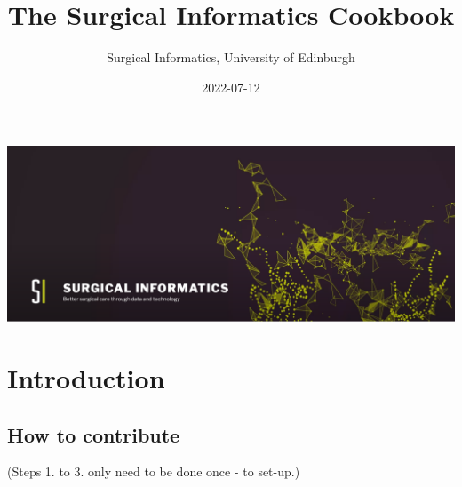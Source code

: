 \documentclass[
]{book}
\title{The Surgical Informatics Cookbook}
\author{Surgical Informatics, University of Edinburgh}
\date{2022-07-12}
\begin{document}
\maketitle

{
\setcounter{tocdepth}{1}
\tableofcontents
}
\hypertarget{section}{%
\chapter*{}\label{section}}

\includegraphics[width=30.97in]{img/surgical_informatics_minibanner}

\hypertarget{introduction}{%
\chapter{Introduction}\label{introduction}}

\hypertarget{how-to-contribute}{%
\section{How to contribute}\label{how-to-contribute}}

(Steps 1. to 3. only need to be done once - to set-up.)
\end{document}
